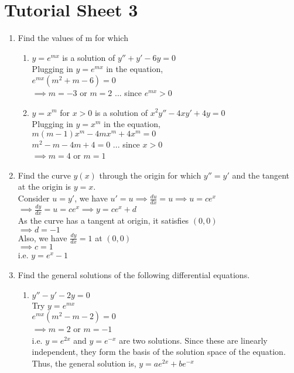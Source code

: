 \documentclass[a4paper]{article}
\begin{document}
\section{Tutorial Sheet 3}

\begin{enumerate}
	\item Find the values of m for which
	\begin{enumerate}
		\item $y=e^{mx}$ is a solution of $y''+y'-6y=0$
			\\Plugging in $y=e^{mx}$ in the equation,
			\\$e^{mx}(m^2+m-6)=0$
			\\$\implies m=-3$ or $m=2$ \hfill ... since $e^{mx}>0$
		\item $y=x^m$ for $x>0$ is a solution of $x^2y''-4xy'+4y=0$
			\\Plugging in $y=x^m$ in the equation,
			\\$m(m-1)x^m-4mx^m+4x^m=0$
			\\$m^2-m-4m+4=0$ \hfill ... since $x>0$
			\\$\implies m=4$ or $m=1$
	\end{enumerate}
	
	\item Find the curve $y(x)$ through the origin for which $y''=y'$ and the tangent at the origin is $y=x$.
	\\Consider $u=y'$, we have $u'=u \implies \frac{du}{dx}=u \implies u=ce^x$
	\\$\implies \frac{dy}{dx}=u=ce^x \implies y=ce^x + d$
	\\As the curve has a tangent at origin, it satisfies $(0,0)$
	\\$\implies d=-1$
	\\Also, we have $\frac{dy}{dx}=1$ at $(0,0)$
	\\$\implies c=1$
	\\i.e. $y=e^x-1$
	
	\item Find the general solutions of the following differential equations.
	\begin{enumerate}
		\item $y''-y'-2y=0$
			\\Try $y=e^{mx}$
			\\$e^{mx}(m^2-m-2)=0$
			\\$\implies m=2$ or $m=-1$
			\\i.e. $y=e^{2x}$ and $y=e^{-x}$ are two solutions. Since these are linearly independent, they form the basis of the solution space of the equation. Thus, the general solution is,
			$y=ae^{2x}+be^{-x}$
		

\end{enumerate}
\end{enumerate}
\end{document}
